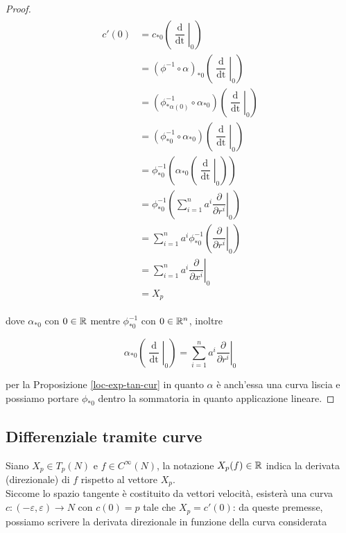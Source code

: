 \begin{proof}
	\begin{align}
		\begin{split}
			c'(0) &= c_{*0} \left( \left. \dfrac{\operatorname{d}}{\operatorname{dt}} \right|_{0} \right)\\
			&= (\phi^{-1} \circ \alpha)_{*0} \left( \left. \dfrac{\operatorname{d}}{\operatorname{dt}} \right|_{0} \right)\\
			&= (\phi^{-1}_{*\alpha(0)} \circ \alpha_{*0}) \left( \left. \dfrac{\operatorname{d}}{\operatorname{dt}} \right|_{0} \right)\\
			&= (\phi^{-1}_{*0} \circ \alpha_{*0}) \left( \left. \dfrac{\operatorname{d}}{\operatorname{dt}} \right|_{0} \right)\\
			&= \phi^{-1}_{*0} \left( \alpha_{*0} \left( \left. \dfrac{\operatorname{d}}{\operatorname{dt}} \right|_{0} \right) \right)\\
			&= \phi^{-1}_{*0} \left( \sum_{i=1}^{n} a^{i} \left. \dfrac{\partial}{\partial r^{i}} \right|_{0} \right)\\
			&= \sum_{i=1}^{n} a^{i} \phi^{-1}_{*0} \left( \left. \dfrac{\partial}{\partial r^{i}} \right|_{0} \right)\\
			&= \sum_{i=1}^{n} a^{i} \left. \dfrac{\partial}{\partial x^{i}} \right|_{0}\\
			&= X_{p}
		\end{split}
	\end{align}

	dove $ \alpha_{*0} $ con $ 0 \in \mathbb{R} $ mentre $ \phi^{-1}_{*0} $ con $ 0 \in \mathbb{R}^{n} $, inoltre
	
	\begin{equation}
		\alpha_{*0} \left( \left. \dfrac{\operatorname{d}}{\operatorname{dt}} \right|_{0} \right) = \sum_{i=1}^{n} a^{i} \left. \dfrac{\partial}{\partial r^{i}} \right|_{0}
	\end{equation}

	per la Proposizione \ref{loc-exp-tan-cur} in quanto $ \alpha $ è anch'essa una curva liscia e possiamo portare $ \phi_{*0} $ dentro la sommatoria in quanto applicazione lineare.
\end{proof}

\subsection{Differenziale tramite curve}

Siano $ X_{p} \in T_{p}(N) $ e $ f \in C^{\infty}(N) $, la notazione $ X_{p}(f) \in \mathbb{R} $ indica la derivata (direzionale) di $ f $ rispetto al vettore $ X_{p} $.\\
Siccome lo spazio tangente è costituito da vettori velocità, esisterà una curva $ c : (-\varepsilon,\varepsilon) \to N $ con $ c(0) = p $ tale che $ X_{p} = c'(0) $: da queste premesse, possiamo scrivere la derivata direzionale in funzione della curva considerata

